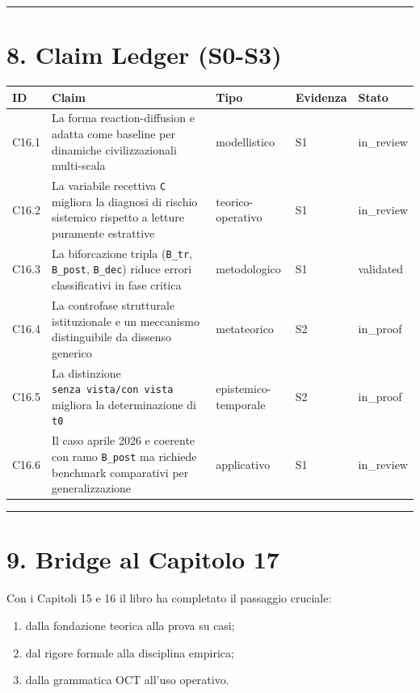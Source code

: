 \begin{center}\rule{0.5\linewidth}{0.5pt}\end{center}

\section{8. Claim Ledger (S0-S3)}

{\def\LTcaptype{none} %
\begin{longtable}[]{@{}lllll@{}}
\toprule\noalign{}
ID & Claim & Tipo & Evidenza & Stato \\
\midrule\noalign{}
\endhead
\bottomrule\noalign{}
\endlastfoot
C16.1 & La forma reaction-diffusion e adatta come baseline per dinamiche civilizzazionali multi-scala & modellistico & S1 & in\_review \\
C16.2 & La variabile recettiva \texttt{C} migliora la diagnosi di rischio sistemico rispetto a letture puramente estrattive & teorico-operativo & S1 & in\_review \\
C16.3 & La biforcazione tripla (\texttt{B\_tr}, \texttt{B\_post}, \texttt{B\_dec}) riduce errori classificativi in fase critica & metodologico & S1 & validated \\
C16.4 & La controfase strutturale istituzionale e un meccanismo distinguibile da dissenso generico & metateorico & S2 & in\_proof \\
C16.5 & La distinzione \texttt{senza\ vista/con\ vista} migliora la determinazione di \texttt{t0} & epistemico-temporale & S2 & in\_proof \\
C16.6 & Il caso aprile 2026 e coerente con ramo \texttt{B\_post} ma richiede benchmark comparativi per generalizzazione & applicativo & S1 & in\_review \\
\end{longtable}
}

\begin{center}\rule{0.5\linewidth}{0.5pt}\end{center}

\section{9. Bridge al Capitolo 17}

Con i Capitoli 15 e 16 il libro ha completato il passaggio cruciale:

\begin{enumerate}
\def\labelenumi{\arabic{enumi}.}
\tightlist
\item
  dalla fondazione teorica alla prova su casi;
\item
  dal rigore formale alla disciplina empirica;
\item
  dalla grammatica OCT all'uso operativo.
\end{enumerate}


